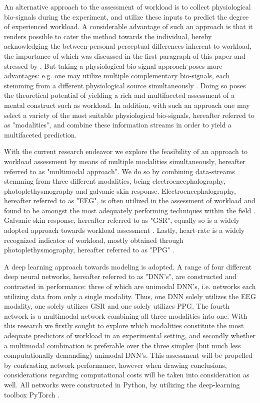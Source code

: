\documentclass[12pt]{article}
\begin{document}
An alternative approach to the assessment of workload is to collect physiological bio-signals during the experiment, and utilize these inputs to predict the degree of experienced workload.  A considerable advantage of such an approach is that it renders possible to cater the method towards the individual,  hereby acknowledging the between-personal perceptual differences inherent to workload, the importance of which was discussed in the first paragraph of this paper and stressed by . But taking a physiological bio-signal-approach poses more advantages: e.g. one may utilize multiple complementary bio-signals, each stemming from a different physiological source simultaneously \cite{ramachandram2017deep}. Doing so poses the theoretical potential of yielding a rich and multifaceted assessment of a mental construct such as workload. In addition, with such an approach one may select a variety of the most suitable physiological bio-signals, hereafter referred to as "modalities",  and combine these information streams in order to yield a multifaceted prediction.

With the current research endeavor we explore the feasibility of an approach to workload assessment by means of multiple modalities simultaneously, hereafter referred to as "multimodal approach". We do so by combining data-streams stemming from three different modalities, being electroencephalography, photoplethysmography and galvanic skin response. Electroencephalography,  hereafter referred to as "EEG", is often utilized in the assessment of workload \cite{craik2019deep} \cite{berka2005evaluation} and found to be amongst the most adequately performing techniques within the field \cite{hogervorst2014combining}. Galvanic skin response, hereafter referred to as "GSR", equally so is a widely adopted approach towards workload assessment \cite{nourbakhsh2012using} \cite{zhou2015dynamic}. Lastly, heart-rate is a widely recognized indicator of workload, mostly obtained through photoplethysmography, hereafter referred to as "PPG" \cite{zhang2018evaluating} \cite{jimenez2018using}. 

A deep learning approach towards modeling is adopted. A range of four different deep neural networks, hereafter referred to as "DNN's", are constructed and contrasted in performance: three of which are unimodal DNN's, i.e. networks each utilizing data from only a single modality. Thus,  one DNN solely utilizes the EEG modality,  one solely utilizes GSR and one solely utilizes PPG. The fourth network is a multimodal network combining all three modalities into one. With this research we firstly sought to explore which modalities constitute the most adequate predictors of workload in an experimental setting, and secondly whether a multimodal combination is preferable over the three simpler (but much less computationally demanding) unimodal DNN's. This assessment will be propelled by contrasting network performance, however when drawing conclusions, considerations regarding computational costs will be taken into consideration as well. All networks were constructed in Python, by utilizing the deep-learning toolbox PyTorch \cite{paszke2017automatic}. 
\end{document}
